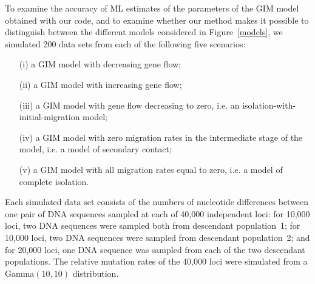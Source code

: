 \documentclass[11pt]{article}
\begin{document}
To examine the accuracy of ML estimates of the parameters of the GIM model obtained with our code, 
and to examine whether our method makes it possible to distinguish between the different models considered in Figure~\ref{models},
we simulated 200 data sets from each of the following five scenarios:
\begin{enumerate}
\item[(i)] a GIM model with decreasing gene flow;
\item[(ii)] a GIM model with increasing gene flow;
\item[(iii)] a GIM model with gene flow decreasing to zero, i.e. an isolation-with-initial-migration model;
\item[(iv)] a GIM model with zero migration rates in the intermediate stage of the model, i.e. a model of secondary contact;
\item[(v)] a GIM model with all migration rates equal to zero, i.e. a model of complete isolation.
\end{enumerate}
Each simulated data set consists of the numbers of nucleotide differences between one pair of DNA sequences sampled at each of 40,000 independent loci: for 10,000 loci, two DNA sequences were sampled both from descendant population~1; for 10,000 loci, two DNA sequences were sampled from descendant population~2; and for 20,000 loci, one DNA sequence was sampled from each of the two descendant populations. The relative mutation rates of the 40,000 loci were simulated from a Gamma$(10,10)$ distribution. 
\end{document}
